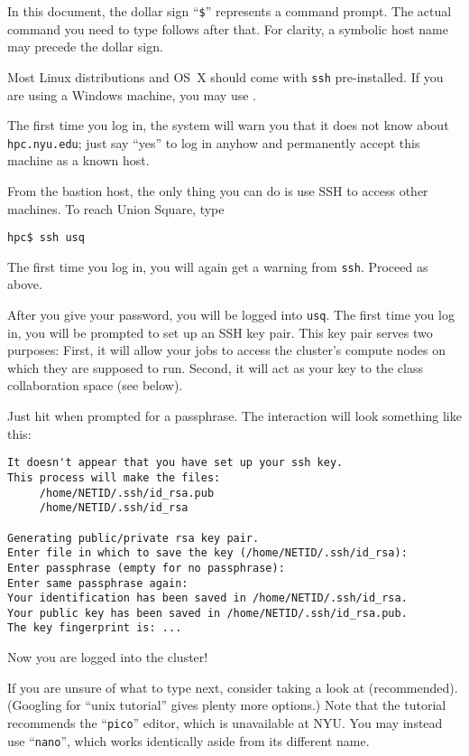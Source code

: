 \documentclass[11pt]{article}
\begin{document}
\begin{enumerate}
\begin{note}
In this document, the dollar sign ``\texttt{\$}'' represents a
command prompt. The actual command you need to type follows after that. For
clarity, a symbolic host name may precede the dollar sign.
\end{note}

Most Linux distributions and OS~X should come with \texttt{ssh}
pre-installed.  If you are using a Windows machine, you may use
.

The first time you log in, the system will warn you that it does not
know about \texttt{hpc.nyu.edu}; just say ``yes'' to log in anyhow and
permanently accept this machine as a known host.

From the bastion host, the only thing you can do is use SSH to access other
machines. To reach Union Square, type
\begin{lstlisting}
hpc$ ssh usq
\end{lstlisting}
The first time you log in, you will again get a warning from
\texttt{ssh}. Proceed as above.

After you give your password, you will be logged into \texttt{usq}.
The first time you log in, you will be prompted to set up an SSH key
pair.  This key pair serves two purposes: First, it will
allow your jobs to access the cluster's compute nodes on which they
are supposed to run. Second, it will act as your key to the class
collaboration space (see below).

Just hit \Enter when prompted for a passphrase. The interaction will
look something like this:

\begin{lstlisting}
It doesn't appear that you have set up your ssh key.
This process will make the files:
     /home/NETID/.ssh/id_rsa.pub
     /home/NETID/.ssh/id_rsa

Generating public/private rsa key pair.
Enter file in which to save the key (/home/NETID/.ssh/id_rsa):
Enter passphrase (empty for no passphrase):
Enter same passphrase again:
Your identification has been saved in /home/NETID/.ssh/id_rsa.
Your public key has been saved in /home/NETID/.ssh/id_rsa.pub.
The key fingerprint is: ...
\end{lstlisting}

Now you are logged into the cluster!

If you are unsure of what to type next, consider taking a look at
 (recommended). (Googling for ``unix tutorial''
gives plenty more options.) Note that the tutorial recommends the
``\texttt{pico}'' editor, which is unavailable at NYU. You may instead
use ``\texttt{nano}'', which works identically aside from its
different name.


\end{enumerate}
\end{document}
